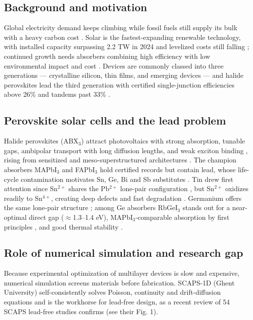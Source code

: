 \documentclass[aip,amsmath,amssymb,preprint]{revtex4-2}
\begin{document}
\subsection{Background and motivation}
Global electricity demand keeps climbing while fossil fuels still supply its bulk with a heavy carbon cost \cite{r1,r2}. Solar is the fastest-expanding renewable technology, with installed capacity surpassing 2.2 TW in 2024 and levelized costs still falling \cite{r3}; continued growth needs absorbers combining high efficiency with low environmental impact and cost \cite{r4}. Devices are commonly classed into three generations --- crystalline silicon, thin films, and emerging devices --- and halide perovskites lead the third generation with certified single-junction efficiencies above 26\% and tandems past 33\% \cite{r3}.

\subsection{Perovskite solar cells and the lead problem}
Halide perovskites (ABX$_{3}$) attract photovoltaics with strong absorption, tunable gaps, ambipolar transport with long diffusion lengths, and weak exciton binding \cite{r7,r8}, rising from sensitized and meso-superstructured architectures \cite{r9,r10}. The champion absorbers MAPbI$_{3}$ and FAPbI$_{3}$ hold certified records \cite{r3,r6} but contain lead, whose life-cycle contamination motivates Sn, Ge, Bi and Sb substitutes \cite{r11,r12}. Tin drew first attention since Sn$^{2+}$ shares the Pb$^{2+}$ lone-pair configuration \cite{r11}, but Sn$^{2+}$ oxidizes readily to Sn$^{4+}$, creating deep defects and fast degradation \cite{r11,r12}. Germanium offers the same lone-pair structure \cite{r13}; among Ge absorbers RbGeI$_{3}$ stands out for a near-optimal direct gap ($\approx$1.3--1.4 eV), MAPbI$_{3}$-comparable absorption by first principles \cite{r13,r17,r18}, and good thermal stability \cite{r14}.

\subsection{Role of numerical simulation and research gap}
Because experimental optimization of multilayer devices is slow and expensive, numerical simulation screens materials before fabrication. SCAPS-1D (Ghent University) self-consistently solves Poisson, continuity and drift-diffusion equations \cite{r19,r20} and is the workhorse for lead-free design, as a recent review of 54 SCAPS lead-free studies confirms \cite{rReview} (see their Fig. 1).
\end{document}
